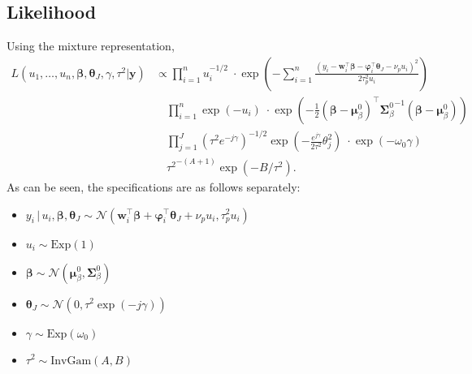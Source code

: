 \documentclass[12pt]{article}
\newcommand{\bs}{\boldsymbol}
\begin{document}
\subsection{Likelihood}
Using the mixture representation,
\begin{align}
  L\left(u_{1}, \ldots , u_{n}, \bs{\beta}, \bs{\theta}_{J}, \gamma, \tau^{2}|\mathbf{y}\right) &\propto \prod_{i=1}^{n}u_{i}^{-1/2}\;\cdot \exp\left(-\sum_{i=1}^{n}\frac{\left(y_{i}-\bs{w}_{i}^{\top}\bs{\beta}-\bs{\varphi}_{i}^{\top}\bs{\theta}_{J}-\nu_{p}u_{i}\right)^{2}}{2\tau_{p}^{2}u_{i}} \right)\\
  &\quad \prod_{i=1}^{n}\exp\left(-u_{i}\right)\;\cdot\exp\left(-\frac{1}{2}\left(\bs{\beta}-\bs{\mu}_{\beta}^{0}\right)^{\top}{\bs{\Sigma}_{\beta}^{0}}^{-1}\left(\bs{\beta}-\bs{\mu}_{\beta}^{0}\right)\right)\\
  &\quad \prod_{j=1}^{J}\left(\tau^{2}e^{-j\gamma}\right)^{-1/2}\exp\left(-\frac{e^{j\gamma}}{2\tau^{2}}\theta_{j}^{2}\right)\;\cdot \exp\left(-\omega_{0}\gamma\right)\\
  &\quad {\tau^{2}}^{-\left(A+1\right)}\exp\left(-B/\tau^{2}\right).
\end{align}
As can be seen, the specifications are as follows separately:
\begin{itemize}
  \item $y_{i}\,|\,u_{i}, \bs{\beta},\bs{\theta}_{J} \sim \mathcal{N}\left(\bs{w}_{i}^{\top}\bs{\beta}+\bs{\varphi}_{i}^{\top}\bs{\theta}_{J}+\nu_{p}u_{i}, \tau_{p}^{2}u_{i}\right)$
  \item $u_{i}\sim \mathrm{Exp}\left(1\right)$
  \item $\bs{\beta} \sim \mathcal{N}\left(\bs{\mu}_{\beta}^{0}, \bs{\Sigma}_{\beta}^{0}\right)$
  \item $\bs{\theta}_{J}\sim \mathcal{N}\left(0, \tau^{2}\exp\left(-j\gamma \right)\right)$
  \item $\gamma \sim \mathrm{Exp}\left(\omega_{0}\right)$
  \item $\tau^{2} \sim \mathrm{InvGam}\left(A,B\right)$
\end{itemize}
\end{document}
